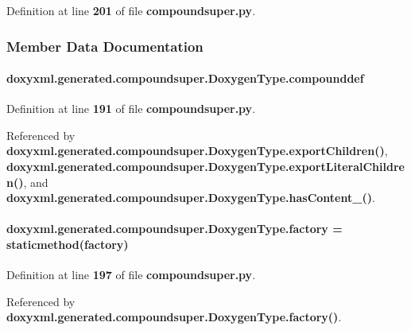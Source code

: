 Definition at line {\bf 201} of file {\bf compoundsuper.\+py}.



\subsubsection{Member Data Documentation}
\paragraph[{compounddef}]{\setlength{\rightskip}{0pt plus 5cm}doxyxml.\+generated.\+compoundsuper.\+Doxygen\+Type.\+compounddef}\label{classdoxyxml_1_1generated_1_1compoundsuper_1_1DoxygenType_a9029fc70c58222f043415310affbcaeb}


Definition at line {\bf 191} of file {\bf compoundsuper.\+py}.



Referenced by {\bf doxyxml.\+generated.\+compoundsuper.\+Doxygen\+Type.\+export\+Children()}, {\bf doxyxml.\+generated.\+compoundsuper.\+Doxygen\+Type.\+export\+Literal\+Children()}, and {\bf doxyxml.\+generated.\+compoundsuper.\+Doxygen\+Type.\+has\+Content\+\_\+()}.

\paragraph[{factory}]{\setlength{\rightskip}{0pt plus 5cm}doxyxml.\+generated.\+compoundsuper.\+Doxygen\+Type.\+factory = staticmethod(factory)\hspace{0.3cm}{\ttfamily [static]}}\label{classdoxyxml_1_1generated_1_1compoundsuper_1_1DoxygenType_acc59655b76b41c4aa2280e4aa6bac8e9}


Definition at line {\bf 197} of file {\bf compoundsuper.\+py}.



Referenced by {\bf doxyxml.\+generated.\+compoundsuper.\+Doxygen\+Type.\+factory()}.

